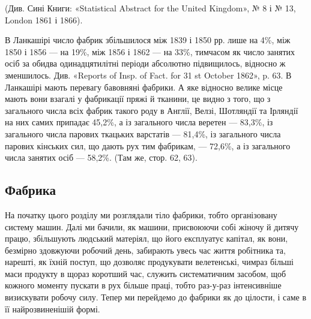 {\begin{footnotesize}
\begin{tabularx}{\textwidth}{Xrrrr}
\end{tabularx}
\end{footnotesize}
\setlength{\tabcolsep}{\tabcolsepdef}

(Див. Сині Книги: «Statistical Abstract for the United Kingdom»,
№ 8 і № 13, London 1861 і 1866).

В Ланкашірі число фабрик збільшилося між 1839 і 1850 рр. лише на
4\%, між 1850 і 1856 — на 19\%, між 1856 і 1862 — на 33\%, тимчасом
як число занятих осіб за обидва одинадцятилітні періоди абсолютно підвищилось,
відносно ж зменшилось. Див. «Reports of Insp. of Fact. for
31 st October 1862», p. 63. В Ланкашірі мають перевагу бавовняні фабрики.
А яке відносно велике місце мають вони взагалі у фабрикації пряжі й
тканини, це видно з того, що з загального числа всіх фабрик такого роду
в Англії, Велзі, Шотляндії та Ірляндії на них самих припадає 45,2\%, а із
загального числа веретен — 83,3\%, із загального числа парових ткацьких
варстатів — 81,4\%, із загального числа парових кінських сил, що дають
рух тим фабрикам, — 72,6\%, а із загального числа занятих осіб — 58,2\%.
(Там же, стор. 62, 63).
}

\subsection{Фабрика}

На початку цього розділу ми розглядали тіло фабрики, тобто
організовану систему машин. Далі ми бачили, як машини, присвоюючи
собі жіночу й дитячу працю, збільшують людський
матеріял, що його експлуатує капітал, як вони, безмірно здовжуючи
робочий день, забирають увесь час життя робітника та,
нарешті, як їхній поступ, що дозволяє продукувати велетенські,
чимраз більші маси продукту в щораз коротший час, служить
систематичним засобом, щоб кожного моменту пускати в рух
більше праці, тобто раз-у-раз інтенсивніше визискувати робочу
силу. Тепер ми перейдемо до фабрики як до цілости, і саме в її
найрозвиненішій формі.

